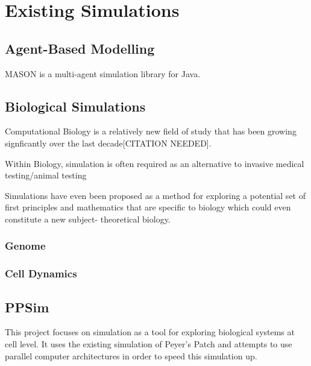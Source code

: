 \documentclass{UoYCSproject}
\begin{document}
\section{Existing Simulations}

\subsection{Agent-Based Modelling}
\label{abm}
MASON is a multi-agent simulation library for Java.

\subsection{Biological Simulations}
Computational Biology is a relatively new field of study that has been growing signficantly over the last decade[CITATION NEEDED].

Within Biology, simulation is often required as an alternative to invasive medical testing/animal testing


Simulations have even been proposed as a method for exploring a potential set of first principles and mathematics that are specific to biology which could even constitute a new subject- theoretical biology\cite{rise_article}.

\subsubsection{Genome}


\subsubsection{Cell Dynamics}


\subsection{PPSim}
\label{ppsim}
This project focuses on simulation as a tool for exploring biological systems at cell level. It uses the existing simulation of Peyer's Patch\cite{kieran_thesis} and attempts to use parallel computer architectures in order to speed this simulation up. %
\end{document}
